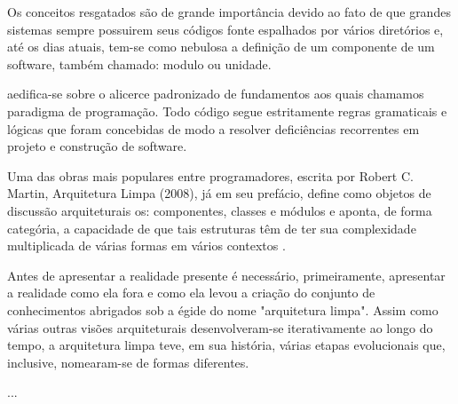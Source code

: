 

  Os conceitos resgatados são de grande importância devido ao fato de que grandes sistemas sempre
  possuirem seus códigos fonte espalhados por vários diretórios e, até os dias atuais, tem-se como
  nebulosa a definição de um componente de um software, também chamado: modulo ou unidade.

  aedifica-se sobre o alicerce padronizado de fundamentos aos quais chamamos paradigma de programação.
  Todo código segue estritamente regras gramaticais e lógicas que foram concebidas de modo a resolver
  deficiências recorrentes em projeto e construção de software.

  Uma das obras mais populares entre programadores, escrita por Robert C. Martin, Arquitetura Limpa (2008),
  já em seu prefácio, define como objetos de discussão arquiteturais os: componentes, classes e módulos
  e aponta, de forma categória, a capacidade de que tais estruturas têm de ter sua complexidade
  multiplicada de várias formas em vários contextos \cite{}.
      

  Antes de apresentar a realidade presente é necessário, primeiramente, apresentar a
  realidade como ela fora e como ela levou a criação do conjunto de conhecimentos abrigados
  sob a égide do nome "arquitetura limpa".
    Assim como várias outras visões arquiteturais desenvolveram-se iterativamente ao longo do tempo,
  a arquitetura limpa teve, em sua história, várias etapas evolucionais que, inclusive, nomearam-se de
  formas diferentes.
  
  ...
